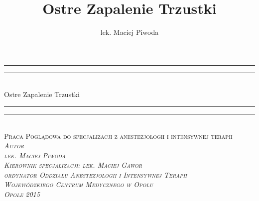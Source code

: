 \documentclass[a4paper, 12pt]{report}
\author{lek. Maciej Piwoda}
\title{Ostre Zapalenie Trzustki}
\newcommand\blankpage{\newpage \null \thispagestyle{empty} \addtocounter{page}{-1}}
\begin{document}
\date{}
\begin{titlepage}
  \centering \vspace*{\baselineskip}
  \rule{\textwidth}{1.6pt}\vspace*{-\baselineskip}\vspace*{2pt}
  \rule{\textwidth}{0.4pt}\\[\baselineskip]
  {\LARGE Ostre Zapalenie Trzustki}\\[0.2\baselineskip]
  \rule{\textwidth}{0.4pt}\vspace*{-\baselineskip}\vspace{3.2pt}
  \rule{\textwidth}{1.6pt}\\[\baselineskip]
  \scshape Praca Poglądowa do specjalizacji z anestezjologii
  i intensywnej terapii\\
  \vspace*{6\baselineskip}
  \itshape{Autor}\\
  {\large{lek. Maciej Piwoda}}\\
  \vfill
  \scshape
  Kierownik specjalizacji: lek. Maciej Gawor\\
  ordynator Oddziału Anestezjologii i Intensywnej Terapii\\
  Wojewódzkiego Centrum Medycznego w Opolu\\
  \vspace*{4\baselineskip}
  Opole 2015
\end{titlepage}
\blankpage
\titleformat{\chapter}[block]{\LARGE\rmfamily}{\thechapter}{1em}{\titlerule\\[.5ex]\bfseries}
\tableofcontents
\thispagestyle{empty}
\addtocounter{page}{-1}
\blankpage
\end{document}
